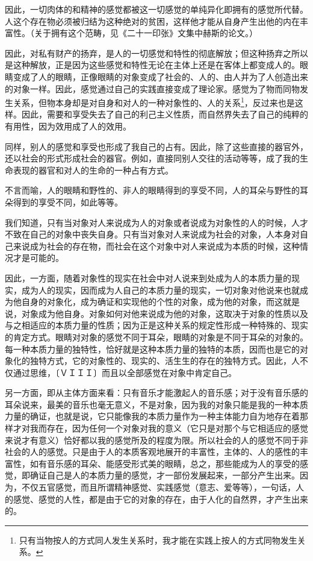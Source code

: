\documentclass[a4paper,twoside,12pt,AutoFakeBold]{ctexart}
\begin{document}
因此，一切肉体的和精神的感觉都被这一切感觉的单纯异化即拥有的感觉所代替。人这个存在物必须被归结为这种绝对的贫困，这样他才能从自身产生出他的内在丰富性。（关于拥有这个范畴，见《二十一印张》文集中赫斯的论文。）

因此，对私有财产的扬弃，是人的一切感觉和特性的彻底解放；但这种扬弃之所以是这种解放，正是因为这些感觉和特性无论在主体上还是在客体上都变成人的。眼睛变成了人的眼睛，正像眼睛的对象变成了社会的、人的、由人并为了人创造出来的对象一样。因此，感觉通过自己的实践直接变成了理论家。感觉为了物而同物发生关系，但物本身却是对自身和对人的一种对象性的、人的关系\footnote{只有当物按人的方式同人发生关系时，我才能在实践上按人的方式同物发生关系。}，反过来也是这样。因此，需要和享受失去了自己的利己主义性质，而自然界失去了自己的纯粹的有用性，因为效用成了人的效用。

同样，别人的感觉和享受也形成了我自己的占有。因此，除了这些直接的器官外，还以社会的形式形成社会的器官。例如，直接同别人交往的活动等等，成了我的生命表现的器官和对人的生命的一种占有方式。

不言而喻，人的眼睛和野性的、非人的眼睛得到的享受不同，人的耳朵与野性的耳朵得到的享受不同，如此等等。

我们知道，只有当对象对人来说成为人的对象或者说成为对象性的人的时候，人才不致在自己的对象中丧失自身。只有当对象对人来说成为社会的对象，人本身对自己来说成为社会的存在物，而社会在这个对象中对人来说成为本质的时候，这种情况才是可能的。

因此，一方面，随着对象性的现实在社会中对人说来到处成为人的本质力量的现实，成为人的现实，因而成为人自己的本质力量的现实，一切对象对他说来也就成为他自身的对象化，成为确证和实现他的个性的对象，成为他的对象，而这就是说，对象成为他自身。对象如何对他来说成为他的对象，这取决于对象的性质以及与之相适应的本质力量的性质；因为正是这种关系的规定性形成一种特殊的、现实的肯定方式。眼睛对对象的感觉不同于耳朵，眼睛的对象是不同于耳朵的对象的。每一种本质力量的独特性，恰好就是这种本质力量的独特的本质，因而也是它的对象化的独特方式，它的对象性的、现实的、活生生的存在的独特方式。因此，人不仅通过思维，〔ＶＩＩＩ〕而且以全部感觉在对象中肯定自己。

另一方面，即从主体方面来看：只有音乐才能激起人的音乐感；对于没有音乐感的耳朵说来，最美的音乐也毫无意义，不是对象，因为我的对象只能是我的一种本质力量的确证，也就是说，它只能像我的本质力量作为一种主体能力自为地存在着那样才对我而存在，因为任何一个对象对我的意义（它只是对那个与它相适应的感觉来说才有意义）恰好都以我的感觉所及的程度为限。所以社会的人的感觉不同于非社会的人的感觉。只是由于人的本质客观地展开的丰富性，主体的、人的感性的丰富性，如有音乐感的耳朵、能感受形式美的眼睛，总之，那些能成为人的享受的感觉，即确证自己是人的本质力量的感觉，才一部份发展起来，一部分产生出来。因为，不仅五官感觉，而且所谓精神感觉、实践感觉（意志、爱等等），一句话，人的感觉、感觉的人性，都是由于它的对象的存在，由于人化的自然界，才产生出来的。
\end{document}
